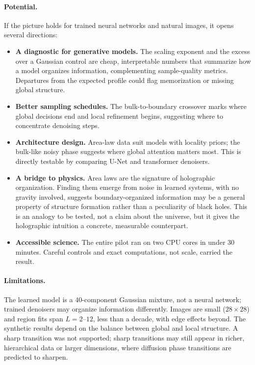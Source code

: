 \documentclass[10pt,twocolumn,a4paper]{article}
\begin{document}
\paragraph{Potential.} If the picture holds for trained neural networks and natural images, it opens several directions:
\begin{itemize}
\item \textbf{A diagnostic for generative models.} The scaling exponent and the excess over a Gaussian control are cheap, interpretable numbers that summarize how a model organizes information, complementing sample-quality metrics. Departures from the expected profile could flag memorization or missing global structure.
\item \textbf{Better sampling schedules.} The bulk-to-boundary crossover marks where global decisions end and local refinement begins, suggesting where to concentrate denoising steps.
\item \textbf{Architecture design.} Area-law data suit models with locality priors; the bulk-like noisy phase suggests where global attention matters most. This is directly testable by comparing U-Net and transformer denoisers.
\item \textbf{A bridge to physics.} Area laws are the signature of holographic organization. Finding them emerge from noise in learned systems, with no gravity involved, suggests boundary-organized information may be a general property of structure formation rather than a peculiarity of black holes. This is an analogy to be tested, not a claim about the universe, but it gives the holographic intuition a concrete, measurable counterpart.
\item \textbf{Accessible science.} The entire pilot ran on two CPU cores in under 30 minutes. Careful controls and exact computations, not scale, carried the result.
\end{itemize}

\paragraph{Limitations.} The learned model is a 40-component Gaussian mixture, not a neural network; trained denoisers may organize information differently. Images are small ($28\times28$) and region fits span $L=2$--$12$, less than a decade, with edge effects beyond. The synthetic results depend on the balance between global and local structure. A sharp transition was not supported; sharp transitions may still appear in richer, hierarchical data or larger dimensions, where diffusion phase transitions are predicted to sharpen.
\end{document}
